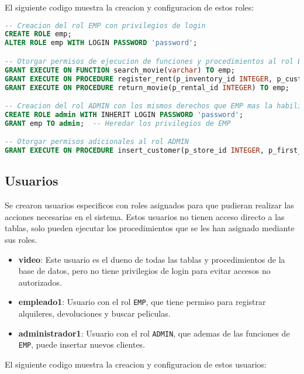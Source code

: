 \documentclass{article}
\begin{document}
El siguiente codigo muestra la creacion y configuracion de estos roles:

\begin{lstlisting}[language=SQL]
-- Creacion del rol EMP con privilegios de login
CREATE ROLE emp;
ALTER ROLE emp WITH LOGIN PASSWORD 'password';

-- Otorgar permisos de ejecucion de funciones y procedimientos al rol EMP
GRANT EXECUTE ON FUNCTION search_movie(varchar) TO emp;
GRANT EXECUTE ON PROCEDURE register_rent(p_inventory_id INTEGER, p_customer_id INTEGER, p_staff_id INTEGER) TO emp;
GRANT EXECUTE ON PROCEDURE return_movie(p_rental_id INTEGER) TO emp;

-- Creacion del rol ADMIN con los mismos derechos que EMP mas la habilidad de insertar clientes
CREATE ROLE admin WITH INHERIT LOGIN PASSWORD 'password';
GRANT emp TO admin;  -- Heredar los privilegios de EMP

-- Otorgar permisos adicionales al rol ADMIN
GRANT EXECUTE ON PROCEDURE insert_customer(p_store_id INTEGER, p_first_name VARCHAR, p_last_name VARCHAR, p_email VARCHAR, p_address_id INTEGER, p_active_bool BOOLEAN) TO admin;
\end{lstlisting}

\subsection{Usuarios}

Se crearon usuarios especificos con roles asignados para que pudieran realizar las acciones necesarias en el sistema. Estos usuarios no tienen acceso directo a las tablas, solo pueden ejecutar los procedimientos que se les han asignado mediante sus roles.

\begin{itemize}
    \item \textbf{video}: Este usuario es el dueno de todas las tablas y procedimientos de la base de datos, pero no tiene privilegios de login para evitar accesos no autorizados.
    \item \textbf{empleado1}: Usuario con el rol \texttt{EMP}, que tiene permiso para registrar alquileres, devoluciones y buscar peliculas.
    \item \textbf{administrador1}: Usuario con el rol \texttt{ADMIN}, que ademas de las funciones de \texttt{EMP}, puede insertar nuevos clientes.
\end{itemize}

El siguiente codigo muestra la creacion y configuracion de estos usuarios:
\end{document}
